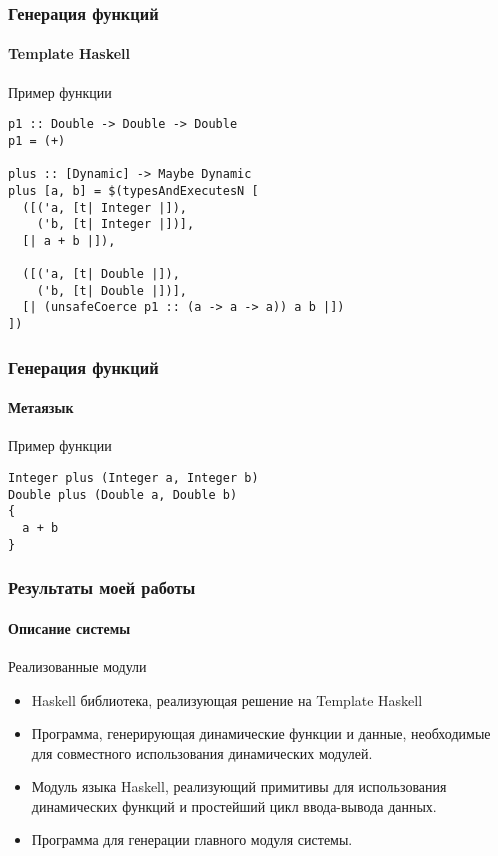 \documentclass[ucs]{beamer}
\begin{document}

\begin{frame}[fragile]
  \frametitle{Генерация функций}
  \framesubtitle{Template Haskell}

  \begin{block}{Пример функции}
\begin{verbatim}
p1 :: Double -> Double -> Double
p1 = (+)

plus :: [Dynamic] -> Maybe Dynamic
plus [a, b] = $(typesAndExecutesN [
  ([('a, [t| Integer |]),
    ('b, [t| Integer |])],
  [| a + b |]),

  ([('a, [t| Double |]),
    ('b, [t| Double |])],
  [| (unsafeCoerce p1 :: (a -> a -> a)) a b |])
])
\end{verbatim}
  \end{block}
\end{frame}

\begin{frame}[fragile]
  \frametitle{Генерация функций}
  \framesubtitle{Метаязык}

  \begin{block}{Пример функции}
\begin{verbatim}
Integer plus (Integer a, Integer b)
Double plus (Double a, Double b)
{
  a + b
}
\end{verbatim}
  \end{block}
\end{frame}

\begin{frame}[fragile]
  \frametitle{Результаты моей работы}
  \framesubtitle{Описание системы}
  
  \begin{block}{Реализованные модули}
    \begin{itemize}
    \item Haskell библиотека, реализующая решение на Template Haskell
    \item Программа, генерирующая динамические функции и данные,
      необходимые для совместного использования динамических модулей.
    \item Модуль языка Haskell, реализующий примитивы для использования
      динамических функций и простейший цикл ввода-вывода данных.
    \item Программа для генерации главного модуля системы.
    \end{itemize}
  \end{block}
\end{frame}
\end{document}
